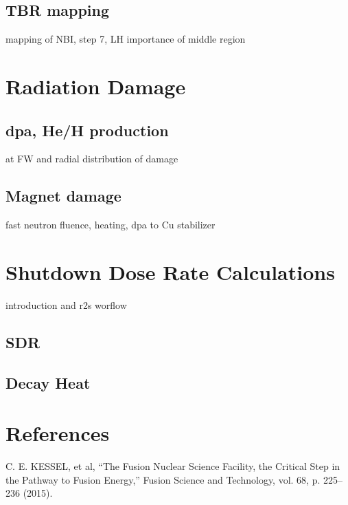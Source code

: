 \documentclass[12pt, letterpaper]{elsarticle}
\begin{document}
\subsection{TBR mapping}
mapping of NBI, step 7, LH
importance of middle region
\section{Radiation Damage}
\subsection{dpa, He/H production}
at FW and radial distribution of damage
\subsection{Magnet damage}
fast neutron fluence, heating, dpa to Cu stabilizer

\section{Shutdown Dose Rate Calculations}
introduction and r2s worflow
\subsection{SDR}
\subsection{Decay Heat}

\newpage
\section{References}
\begin{thebibliography}{10} 
C. E. KESSEL, et al, {“The Fusion Nuclear Science Facility, the Critical Step in the Pathway to Fusion Energy,” Fusion Science and Technology, vol. 68, p. 225–236 (2015).}
\end{thebibliography}
\end{document}
